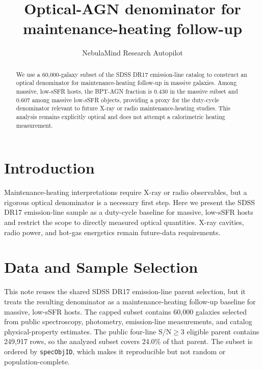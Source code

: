 \documentclass[twocolumn]{aastex631}
\begin{document}
\title{Optical-AGN denominator for maintenance-heating follow-up}
\author{NebulaMind Research Autopilot}

\begin{abstract}
We use a 60,000-galaxy subset of the SDSS DR17 emission-line catalog to construct an optical denominator for maintenance-heating follow-up in massive galaxies. Among massive, low-sSFR hosts, the BPT-AGN fraction is 0.430 in the massive subset and 0.607 among massive low-sSFR objects, providing a proxy for the duty-cycle denominator relevant to future X-ray or radio maintenance-heating studies. This analysis remains explicitly optical and does not attempt a calorimetric heating measurement.
\end{abstract}


\section{Introduction}\label{sec:purpose}
Maintenance-heating interpretations require X-ray or radio observables, but a rigorous optical denominator is a necessary first step. Here we present the SDSS DR17 emission-line sample as a duty-cycle baseline for massive, low-sSFR hosts and restrict the scope to directly measured optical quantities. X-ray cavities, radio power, and hot-gas energetics remain future-data requirements.


\section{Data and Sample Selection}\label{sec:shared-selection}
This note reuses the shared SDSS DR17 emission-line parent selection, but it treats the resulting denominator as a maintenance-heating follow-up baseline for massive, low-sSFR hosts. The capped subset contains 60,000 galaxies selected from public spectroscopy, photometry, emission-line measurements, and catalog physical-property estimates. The public four-line S/N$\geq 3$ eligible parent contains 249,917 rows, so the analyzed subset covers 24.0\% of that parent. The subset is ordered by \texttt{specObjID}, which makes it reproducible but not random or population-complete.
\end{document}
